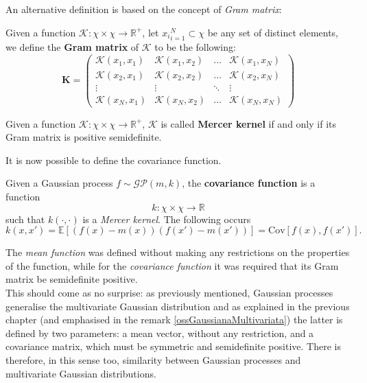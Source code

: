 An alternative definition is based on the concept of \textit{Gram matrix}:

\begin{defi}
  Given a function $\mathcal{K}: \chi\times \chi\rightarrow \mathbb{R}^+$, let ${x_i}_{i=1}^N\subset \chi$ be any set of distinct elements, we define the \textbf{Gram matrix} of $\mathcal{K}$ to be the following:
\[
\bm{K}=\begin{pmatrix}
    \mathcal{K}(x_1,x_1) & \mathcal{K}(x_1,x_2) & \dots & \mathcal{K}(x_1,x_N)\\
    \mathcal{K}(x_2,x_1) & \mathcal{K}(x_2,x_2) & \dots & \mathcal{K}(x_2,x_N)\\
    \vdots & \vdots & \ddots & \vdots\\
    \mathcal{K}(x_N,x_1) & \mathcal{K}(x_N,x_2) & \dots & \mathcal{K}(x_N,x_N)
    \end{pmatrix}
\]
\end{defi}

\begin{defi}
Given a function $
\mathcal{K}: \chi\times\chi \rightarrow \mathbb{R}^+
$, $\mathcal{K}$ is called \textbf{Mercer kernel} if and only if its Gram matrix is positive semidefinite.
\end{defi}

It is now possible to define the covariance function.

\newpage


\begin{defi}
  Given a Gaussian process $f\sim \mathcal{GP}(m,k)$, the \textbf{covariance function} is a function
\[
k:\chi\times \chi \rightarrow \mathbb{R}
\]
such that $k(\cdot,\cdot)$ is a \textit{Mercer kernel}. The following occurs 
\[k(x,x')=\mathbb{E}[(f(x)-m(x))(f(x')-m(x'))]=\text{Cov}[f(x),f(x')].
\]
\end{defi}

\begin{oss}
  The \textit{mean function} was defined without making any restrictions on the properties of the function, while for the \textit{covariance function} it was required that its Gram matrix be semidefinite positive.\\
  This should come as no surprise: as previously mentioned, Gaussian processes generalise the multivariate Gaussian distribution and as explained in the previous chapter (and emphasised in the remark \ref{ossGaussianaMultivariata}) the latter is defined by two parameters: a mean vector, without any restriction, and a covariance matrix, which must be symmetric and semidefinite positive. There is therefore, in this sense too, similarity between Gaussian processes and multivariate Gaussian distributions.
\end{oss}

